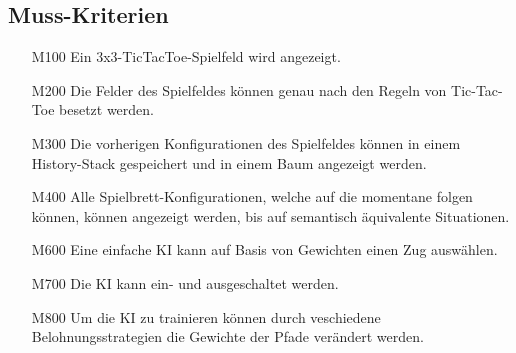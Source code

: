\documentclass[titlepage]{scrartcl}
\begin{document}
\subsection{Muss-Kriterien}
	\begin{itemize}
		\item[M100] Ein 3x3-TicTacToe-Spielfeld wird angezeigt.
		\item[M200] Die Felder des Spielfeldes können genau nach den Regeln von Tic-Tac-Toe besetzt werden.
		\item[M300] Die vorherigen Konfigurationen des Spielfeldes können in einem History-Stack gespeichert und in einem Baum angezeigt werden.
		\item[M400] Alle Spielbrett-Konfigurationen, welche auf die momentane folgen können, können angezeigt werden, bis auf semantisch äquivalente Situationen.
		\item[M600] Eine einfache KI kann auf Basis von Gewichten einen Zug auswählen.
		\item[M700] Die KI kann ein- und ausgeschaltet werden.
		\item[M800] Um die KI zu trainieren können durch veschiedene Belohnungsstrategien die Gewichte der Pfade verändert werden.
	\end{itemize}
\end{document}
